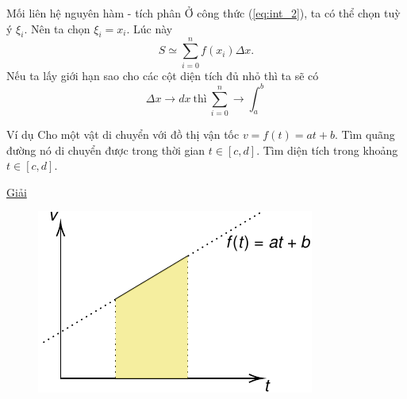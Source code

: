 \begin{frame}{Mối liên hệ nguyên hàm - tích phân}
    Ở công thức (\ref{eq:int_2}), ta có thể chọn tuỳ ý \(\xi_i\). Nên ta chọn \(\xi_i = x_i\). Lúc này
    \begin{equation*}
        S \simeq \sum_{i=0}^n f(x_i) \Delta x.   
    \end{equation*}
    Nếu ta lấy giới hạn sao cho các cột diện tích đủ nhỏ thì ta sẽ có
    \begin{equation}
        \displaystyle
        \Delta x \rightarrow dx \ \text{thì} \ \sum_{i=0}^n \rightarrow \int_{a}^b
        \label{eq:int_3}
    \end{equation}
\end{frame}
\begin{frame}{Ví dụ}
    Cho một vật di chuyển với đồ thị vận tốc \(v = f(t) = at+b\). Tìm quãng đường nó di chuyển được trong thời gian \(t \in [c,d]\). Tìm diện tích trong khoảng \(t \in [c,d]\).
    \begin{center}
                    \underline{Giải}
    \end{center}
    \begin{center}
        \begin{minipage}{0.35\linewidth}
            \begin{figure}
                \centering
                \includegraphics[width=1\linewidth]{Figures/Int_5.pdf}
                \label{fig:Int_5}
            \end{figure}
        \end{minipage}
        \hspace{1mm}
        \begin{minipage}{0.5\linewidth}


\end{minipage}
\end{center}
\end{frame}
